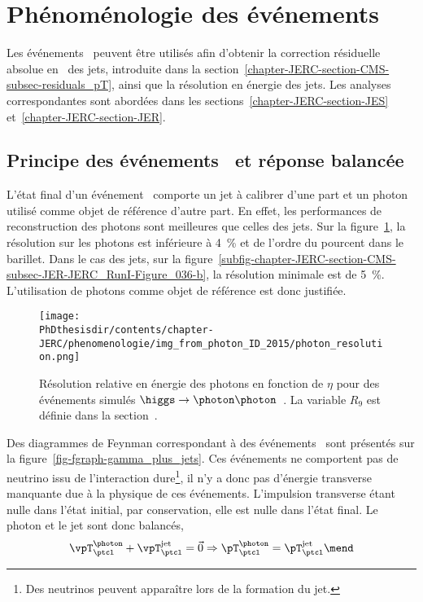 \section{Phénoménologie des événements \Gjet}\label{chapter-JERC-section-pheno-GJets}
Les événements \Gjet\ peuvent être utilisés afin d'obtenir la correction résiduelle absolue en \pT\ des jets, introduite dans la section~\ref{chapter-JERC-section-CMS-subsec-residuals_pT}, ainsi que la résolution en énergie des jets. Les analyses correspondantes sont abordées dans les sections~\ref{chapter-JERC-section-JES} et~\ref{chapter-JERC-section-JER}.
\subsection{Principe des événements \Gjet\ et réponse balancée}
L'état final d'un événement \Gjet\ comporte un jet à calibrer d'une part et un photon utilisé comme objet de référence d'autre part.
En effet, les performances de reconstruction des photons sont meilleures que celles des jets. Sur la figure~\ref{fig-chapter-JERC-section-pheno-GJets-photon_resolution}, la résolution sur les photons est inférieure à \SI{4}{\%} et de l'ordre du pourcent dans le barillet. Dans le cas des jets, sur la figure~\ref{subfig-chapter-JERC-section-CMS-subsec-JER-JERC_RunI-Figure_036-b}, la résolution minimale est de \SI{5}{\%}.
L'utilisation de photons comme objet de référence est donc justifiée.
\begin{figure}[h]
\centering
\texttt{[image: \\PhDthesisdir/contents/chapter-JERC/phenomenologie/img\_from\_photon\_ID\_2015/photon\_resolution.png]}
\caption{Résolution relative en énergie des photons en fonction de $\eta$ pour des événements simulés $\higgs\to\photon\photon$~\cite{photon_ID_2015}. La variable $R_9$ est définie dans la section~.}
\label{fig-chapter-JERC-section-pheno-GJets-photon_resolution}
\end{figure}
\par Des diagrammes de Feynman correspondant à des événements \Gjet\ sont présentés sur la figure~\ref{fig-fgraph-gamma_plus_jets}.
Ces événements ne comportent pas de neutrino issu de l'interaction dure\footnote{Des neutrinos peuvent apparaître lors de la formation du jet.}, il n'y a donc pas d'énergie transverse manquante due à la physique de ces événements.
L'impulsion transverse étant nulle dans l'état initial, par conservation, elle est nulle dans l'état final. Le photon et le jet sont donc balancés, \ie
\begin{equation}
\vpT_\ptcl^{\photon} + \vpT_\ptcl^\text{jet} = \vec{0}
\Rightarrow
\pT_\ptcl^{\photon} = \pT_\ptcl^\text{jet}
\mend
\end{equation}
